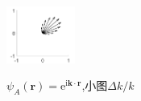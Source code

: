 \documentclass[UTF8]{beamer}
\begin{document}
\begin{frame}
\begin{figure}
{            \centering
            \includegraphics[width = 0.2\textwidth]{../images/figure/HuA50.png}
        }
        \caption{$\psi_A(\mathbf{r})=\mathrm{e}^{\mathrm{i}\mathbf{k}\cdot\mathbf{r}}$,小图$\Delta k/k$}
    \end{figure}
\end{frame}
\end{document}

